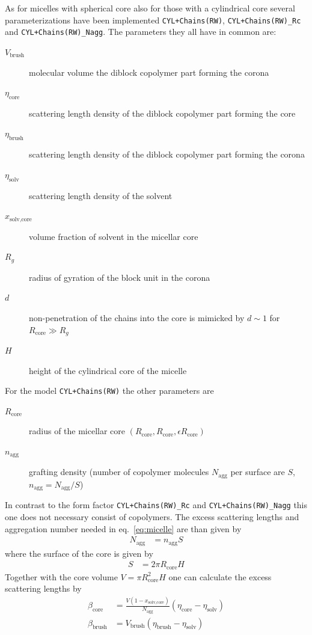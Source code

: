 \noindent
As for micelles with spherical core also for those with a cylindrical core several
parameterizations have been implemented \texttt{CYL+Chains(RW)}, \texttt{CYL+Chains(RW)\_Rc} and
\texttt{CYL+Chains(RW)\_Nagg}.
The parameters they all have in common are: \sloppy
\begin{description}
\item[$V_\text{brush}$] molecular volume the diblock copolymer part forming the corona
\item[$\eta_\text{core}$] scattering length density of the diblock copolymer part forming the core
\item[$\eta_\text{brush}$] scattering length density of the diblock copolymer part forming the corona
\item[$\eta_\text{solv}$] scattering length density of the solvent
\item[$x_\text{solv,core}$] volume fraction of solvent in the micellar core
\item[$R_g$] radius of gyration of the block unit in the corona
\item[$d$]  non-penetration of the chains into the core is mimicked by
$d\sim 1$ for $R_\text{core}\gg R_g$
\item[$H$] height of the cylindrical core of the micelle
\end{description}


\vspace{10mm}

\noindent
For the model \texttt{CYL+Chains(RW)} the other parameters are
\begin{description}
\item[$R_\text{core}$] radius of the micellar core $(R_\text{core},R_\text{core},\epsilon R_\text{core})$
\item[$n_\text{agg}$] grafting density (number of copolymer molecules
$N_\text{agg}$ per surface are $S$, $n_\text{agg}=N_\text{agg}/S$)
\end{description}

\noindent
In contrast to the form factor \texttt{CYL+Chains(RW)\_Rc} and \texttt{CYL+Chains(RW)\_Nagg}
this one does not necessary consist of copolymers.
The excess scattering lengths and aggregation number needed in eq.\
\ref{eq:micelle} are than given by
\begin{align}
N_\text{agg} &= n_\text{agg} S
\end{align}
where the surface of the core is given by
\begin{align}
S  &= 2\pi R_\text{core} H
\end{align}
Together with the core volume $V =\pi R_\text{core}^2 H$
one can calculate the excess scattering lengths by
\begin{align}
\beta_\text{core} &= \frac{V (1-x_\text{solv,core})}{N_\text{agg}}
(\eta_\text{core}-\eta_\text{solv}) \\
\beta_\text{brush} &= V_\text{brush} (\eta_\text{brush}-\eta_\text{solv})
\end{align}

